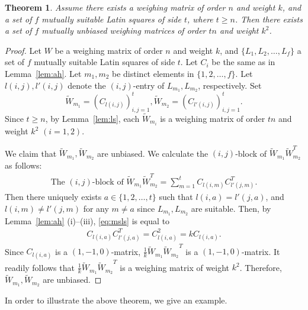 \documentclass[12pt]{article}
\newtheorem{thm}{Theorem}[section]
\theoremstyle{remark}
\begin{document}

\begin{thm}\label{thm:msls}
Assume there exists a weighing matrix of order $n$ and weight $k$, and 
a set of $f$ mutually suitable Latin squares of side $t$, where $t\geq n$.
Then
there exists a set of $f$ mutually unbiased weighing matrices of order $tn$ and weight $k^2$.
\end{thm}
\begin{proof}
Let $W$ be a weighing matrix of order $n$ and weight $k$, and
$\{L_1,L_2,\ldots,L_f\}$ a set of $f$ mutually suitable Latin squares
of side $t$.
Let $C_i$ be the same as in Lemma~\ref{lem:ah}. 
Let $m_1,m_2$ be distinct elements in $\{1,2,\ldots,f\}$. 
Let $l(i,j),l'(i,j)$ denote the $(i,j)$-entry of $L_{m_1},L_{m_2}$, respectively. 
Set 
\[
\widetilde{W}_{m_1}=(C_{l(i,j)})_{i,j=1}^t, \widetilde{W}_{m_2}=(C_{l'(i,j)})_{i,j=1}^t.
\] 
Since $t\geq n$,
by Lemma~\ref{lem:ls}, each $\widetilde{W}_{m_i}$ is a weighing matrix of order $tn$ and weight $k^2$
$(i=1,2)$. 

We claim that $\widetilde{W}_{m_1},\widetilde{W}_{m_2}$ are unbiased. 
We calculate the $(i,j)$-block of $\widetilde{W}_{m_1} \widetilde{W}_{m_2}^T$ as follows:
\begin{align}\label{eq:msls}
\text{The $(i,j)$-block of }\widetilde{W}_{m_1}\widetilde{W}_{m_2}^T
=\sum_{m=1}^t C_{l(i,m)}C^T_{l'(j,m)}.
\end{align}
Then there uniquely exists $a\in\{1,2,\ldots,t\}$ such that $l(i,a)=l'(j,a)$,  
and $l(i,m)\neq l'(j,m)$ for any $m\neq a$ since $L_{m_1},L_{m_2}$ are suitable. 
Then, by Lemma~\ref{lem:ah} (i)--(iii), \eqref{eq:msls} is equal to
\begin{align*}
C_{l(i,a)}C^T_{l'(j,a)}=C_{l(i,a)}^2=kC_{l(i,a)}.
\end{align*}
Since $C_{l(i,a)}$ is a $(1,-1,0)$-matrix,
$\frac{1}{k}\widetilde{W}_{m_1}{\widetilde{W}_{m_2}}^T$ is a $(1,-1,0)$-matrix. It
readily follows that $\frac{1}{k}\widetilde{W}_{m_1}{\widetilde{W}_{m_2}}^T$ is a
weighing matrix of weight $k^2$. Therefore,
$\widetilde{W}_{m_1},{\widetilde{W}_{m_2}}$ are unbiased.
\end{proof}

In order to illustrate the above theorem, we give an example.
\end{document}
